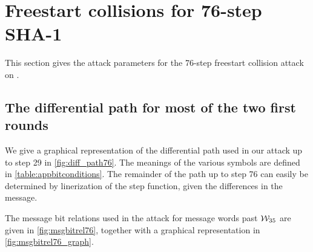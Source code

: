 \section{Freestart collisions for 76-step SHA-1}
\label{sec:res_76}

This section gives the attack parameters for the 76-step freestart collision attack on \shaone.

\subsection{The differential path for most of the two first rounds}
\label{sec:app_diff_path76}

We give a graphical representation of the differential path
used in our attack up to step 29 in \autoref{fig:diff_path76}.
The meanings of the various symbols are defined
in \autoref{table:appbitconditions}.
The remainder of the path up to step 76 can easily
be determined by linerization of the step function, given the differences
in the message.

The message bit relations used in the attack for message words past $\mathcal{W}_{35}$ are given in \autoref{fig:msgbitrel76}, together with a
graphical representation in \autoref{fig:msgbitrel76_graph}.

